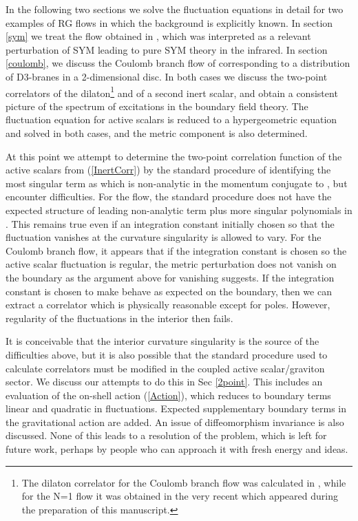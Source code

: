 \documentclass[a4paper,12pt]{article}
\begin{document}
In the following two sections we solve the fluctuation equations in
detail for two examples of RG flows in which the background is
explicitly known. In section \ref{sym} we treat the flow obtained in
\cite{gppz}, which was interpreted as a relevant perturbation of
\coordHE{} SYM leading to pure \coordHE{} SYM theory in the
infrared.  In section \ref{coulomb}, we discuss the Coulomb branch
flow of \cite{fgpw2} corresponding to a distribution of D3-branes in a
2-dimensional disc. In both cases we discuss the two-point correlators
of the dilaton\footnote{The dilaton correlator for the Coulomb branch
flow was calculated in \cite{fgpw2}, while for the N=1 flow it was
obtained in the very recent \cite{agpz} which appeared during the
preparation of this manuscript.  } and of a second inert scalar, and
obtain a consistent picture of the spectrum of excitations in the
boundary field theory.  The fluctuation equation for active scalars is
reduced to a hypergeometric equation and solved in both cases, and the
metric component \coordHE{} is also determined.

At this point we attempt to determine the two-point correlation
function of the active scalars from (\ref{InertCorr}) by the standard
procedure of identifying the most singular term as \coordHE{} which is non-analytic in the momentum \coordHE{} conjugate to
\coordHE{}, but encounter difficulties. For the \coordHE{} flow, the
standard procedure does not have the expected structure of leading
non-analytic term plus more singular polynomials in \coordHE{}. This
remains true even if an integration constant initially chosen so that
the fluctuation vanishes at the curvature singularity is allowed to
vary. For the Coulomb branch flow, it appears that if the integration
constant is chosen so the active scalar fluctuation is regular, the
metric perturbation \coordHE{} does not vanish on the boundary as the
argument above for vanishing \coordHE{} suggests. If the integration
constant is chosen to make \coordHE{} behave as expected on the boundary,
then we can extract a correlator which is physically reasonable except
for \coordHE{} poles.  However, regularity of the fluctuations in the
interior then fails.

It is conceivable that the interior curvature singularity is the
source of the difficulties above, but it is also possible that the
standard procedure used to calculate correlators must be modified in
the coupled active scalar/graviton sector. We discuss our attempts to
do this in Sec \ref{2point}. This includes an evaluation of the
on-shell action (\ref{Action}), which reduces to boundary terms linear
and quadratic in fluctuations.  Expected supplementary boundary terms
in the gravitational action are added. An issue of diffeomorphism
invariance is also discussed. None of this leads to a resolution of
the problem, which is left for future work, perhaps by people who can
approach it with fresh energy and ideas.
\end{document}
